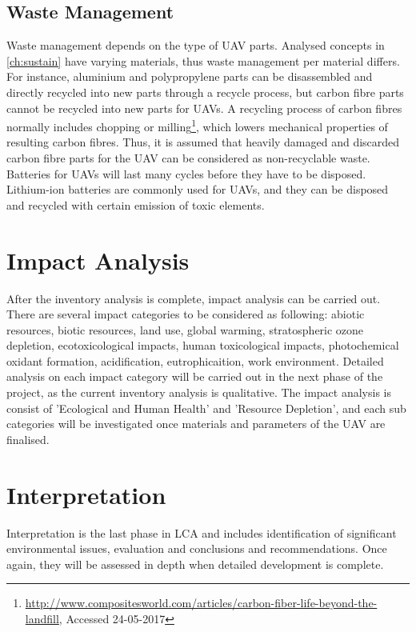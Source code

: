 \subsection{Waste Management}
Waste management depends on the type of UAV parts. Analysed concepts in \autoref{ch:sustain} have varying materials, thus waste management per material differs. For instance, aluminium and polypropylene parts can be disassembled and directly recycled into new parts through a recycle process, but carbon fibre parts cannot be recycled into new parts for UAVs. A recycling process of carbon fibres normally includes chopping or milling\footnote{\url{http://www.compositesworld.com/articles/carbon-fiber-life-beyond-the-landfill}, Accessed 24-05-2017}, which lowers mechanical properties of resulting carbon fibres. Thus, it is assumed that heavily damaged and discarded carbon fibre parts for the UAV can be considered as non-recyclable waste. Batteries for UAVs will last many cycles before they have to be disposed. Lithium-ion batteries are commonly used for UAVs, and they can be disposed and recycled with certain emission of toxic elements.

\section{Impact Analysis}
After the inventory analysis is complete, impact analysis can be carried out. There are several impact categories to be considered as following: abiotic resources, biotic resources, land use, global warming, stratospheric ozone depletion, ecotoxicological impacts, human toxicological impacts, photochemical oxidant formation, acidification, eutrophicaition, work environment. Detailed analysis on each impact category will be carried out in the next phase of the project, as the current inventory analysis is qualitative. The impact analysis is consist of 'Ecological and Human Health' and 'Resource Depletion', and each sub categories will be investigated once materials and parameters of the UAV are finalised.

\section{Interpretation}
Interpretation is the last phase in LCA and includes identification of significant environmental issues, evaluation and conclusions and recommendations\cite{lca}. Once again, they will be assessed in depth when detailed development is complete.  
